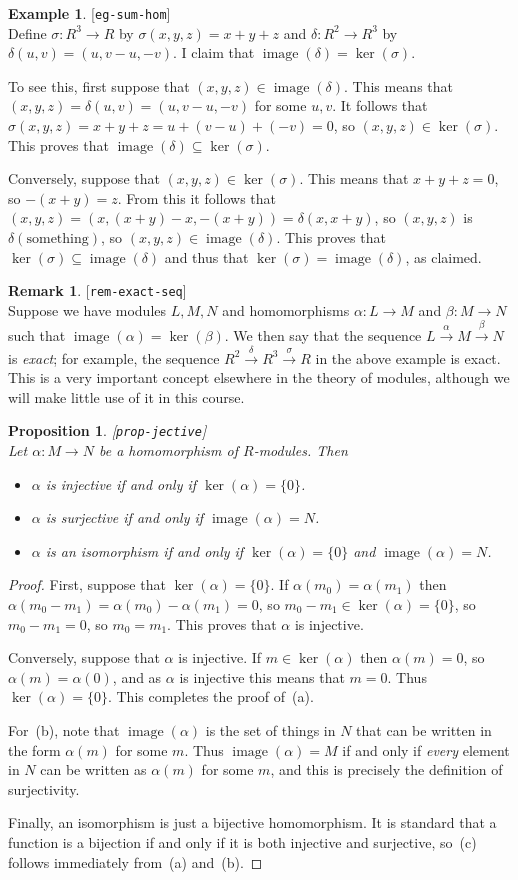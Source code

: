 \documentclass{amsart}
\newcommand{\lbl}[1]{\label{#1}\textup{[\texttt{#1}]}\ \\}
\newcommand{\lbl}{\label}
\newcommand{\img}       {\operatorname{image}}
\newcommand{\al}        {\alpha}
\newcommand{\bt}        {\beta}
\newcommand{\dl}        {\delta}
\newcommand{\sg}        {\sigma}
\newcommand{\sse}       {\subseteq}
\newcommand{\xra}       {\xrightarrow}
\renewcommand{\:}{\colon}
\newtheorem{proposition}[theorem]{Proposition}
\theoremstyle{definition}
\newtheorem{remark}[theorem]{Remark}
\newtheorem{example}[theorem]{Example}
\begin{document}
\begin{example}\lbl{eg-sum-hom}
 Define $\sg\:R^3\xra{}R$ by $\sg(x,y,z)=x+y+z$ and
 $\dl\:R^2\xra{}R^3$ by $\dl(u,v)=(u,v-u,-v)$.  I claim that
 $\img(\dl)=\ker(\sg)$.  

 To see this, first suppose that $(x,y,z)\in\img(\dl)$.  This means
 that $(x,y,z)=\dl(u,v)=(u,v-u,-v)$ for some $u,v$.  It follows that
 $\sg(x,y,z)=x+y+z=u+(v-u)+(-v)=0$, so $(x,y,z)\in\ker(\sg)$.  This
 proves that $\img(\dl)\sse\ker(\sg)$.

 Conversely, suppose that $(x,y,z)\in\ker(\sg)$.  This means that
 $x+y+z=0$, so $-(x+y)=z$.  From this it follows that
 $(x,y,z)=(x,(x+y)-x,-(x+y))=\dl(x,x+y)$, so $(x,y,z)$ is
 $\dl(\text{something})$, so $(x,y,z)\in\img(\dl)$.  This proves that
 $\ker(\sg)\sse\img(\dl)$ and thus that $\ker(\sg)=\img(\dl)$, as
 claimed. 
\end{example}
\begin{remark}\lbl{rem-exact-seq}
 Suppose we have modules $L,M,N$ and homomorphisms $\al\:L\xra{}M$ and
 $\bt\:M\xra{}N$ such that $\img(\al)=\ker(\bt)$.  We then say that
 the sequence $L\xra{\al}M\xra{\bt}N$ is \emph{exact}; for example,
 the sequence $R^2\xra{\dl}R^3\xra{\sg}R$ in the above example is
 exact.  This is a very important concept elsewhere in the theory of
 modules, although we will make little use of it in this course.
\end{remark}

\begin{proposition}\lbl{prop-jective}
 Let $\al\:M\xra{}N$ be a homomorphism of $R$-modules.  Then
 \begin{itemize}
 \item[(a)] $\al$ is injective if and only if $\ker(\al)=\{0\}$.
 \item[(b)] $\al$ is surjective if and only if $\img(\al)=N$.
 \item[(c)] $\al$ is an isomorphism if and only if $\ker(\al)=\{0\}$
  and $\img(\al)=N$.
 \end{itemize}
\end{proposition}
\begin{proof}
 First, suppose that $\ker(\al)=\{0\}$.  If $\al(m_0)=\al(m_1)$ then
 $\al(m_0-m_1)=\al(m_0)-\al(m_1)=0$, so $m_0-m_1\in\ker(\al)=\{0\}$,
 so $m_0-m_1=0$, so $m_0=m_1$.  This proves that $\al$ is injective.

 Conversely, suppose that $\al$ is injective.  If $m\in\ker(\al)$ then
 $\al(m)=0$, so $\al(m)=\al(0)$, and as $\al$ is injective this means
 that $m=0$.  Thus $\ker(\al)=\{0\}$.  This completes the proof
 of~(a). 

 For~(b), note that $\img(\al)$ is the set of things in $N$ that can
 be written in the form $\al(m)$ for some $m$.  Thus $\img(\al)=M$ if
 and only if \emph{every} element in $N$ can be written as $\al(m)$
 for some $m$, and this is precisely the definition of surjectivity.

 Finally, an isomorphism is just a bijective homomorphism.  It is
 standard that a function is a bijection if and only if it is both
 injective and surjective, so~(c) follows immediately from~(a)
 and~(b).  
\end{proof}
\end{document}
